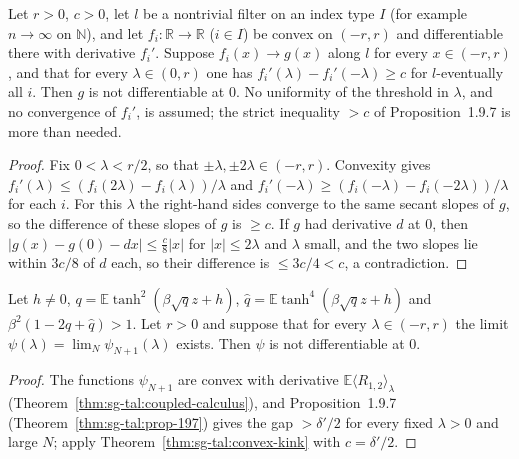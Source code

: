 \begin{theorem}
\label{thm:sg-tal:convex-kink}
  \leanok
{}
Let $r>0$, $c>0$, let $l$ be a nontrivial filter on an index type $I$ (for example $n\to\infty$ on $\mathbb N$), and let $f_i:\mathbb R\to\mathbb R$ ($i\in I$)
be convex on $(-r,r)$ and differentiable there with derivative $f_i'$.  Suppose $f_i(x)\to g(x)$ along $l$
for every $x\in(-r,r)$, and that for every $\lambda\in(0,r)$ one has $f_i'(\lambda)-f_i'(-\lambda)\ge c$ for $l$-eventually all $i$.
Then $g$ is not differentiable at $0$.  No uniformity of the threshold in $\lambda$, and no convergence of $f_i'$, is assumed; the strict
inequality $>c$ of Proposition~1.9.7 is more than needed.
\end{theorem}
\begin{proof}
  \leanok
Fix $0<\lambda<r/2$, so that $\pm\lambda,\pm2\lambda\in(-r,r)$.  Convexity gives $f_i'(\lambda)\le(f_i(2\lambda)-f_i(\lambda))/\lambda$ and $f_i'(-\lambda)\ge(f_i(-\lambda)-f_i(-2\lambda))/\lambda$ for each $i$.  For this
$\lambda$ the right-hand sides converge to the same secant slopes of $g$, so the difference of these slopes of $g$ is $\ge c$.  If $g$ had derivative $d$ at $0$,
then $|g(x)-g(0)-dx|\le\tfrac c8|x|$ for $|x|\le2\lambda$ and $\lambda$ small, and the two slopes lie within $3c/8$ of $d$ each, so their difference is $\le3c/4<c$, a contradiction.
\end{proof}

\begin{theorem}
\label{thm:sg-tal:thm-196}
  \leanok
{}
Let $h\ne0$, $q=\mathbb E\tanh^2(\beta\sqrt qz+h)$, $\hat q=\mathbb E\tanh^4(\beta\sqrt qz+h)$ and $\beta^2(1-2q+\hat q)>1$.  Let $r>0$ and suppose that for every
$\lambda\in(-r,r)$ the limit $\psi(\lambda)=\lim_N\psi_{N+1}(\lambda)$ exists.  Then $\psi$ is not differentiable at $0$.
\end{theorem}
\begin{proof}
  \leanok
The functions $\psi_{N+1}$ are convex with derivative $\mathbb E\langle R_{1,2}\rangle_\lambda$ (Theorem~\ref{thm:sg-tal:coupled-calculus}), and Proposition~1.9.7
(Theorem~\ref{thm:sg-tal:prop-197}) gives the gap $>\delta'/2$ for every fixed $\lambda>0$ and large $N$; apply Theorem~\ref{thm:sg-tal:convex-kink} with $c=\delta'/2$.
\end{proof}

